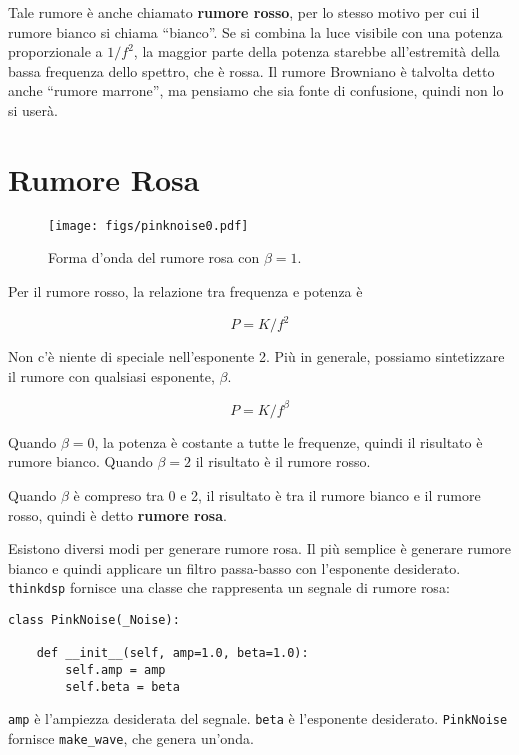 \documentclass[12pt]{book} \usepackage[width=5.5in,height=8.5in, hmarginratio=3:2,vmarginratio=1:1]{geometry}
\begin{document}
Tale rumore è anche chiamato {\bf rumore rosso}, per lo stesso motivo per cui il rumore bianco si chiama ``bianco''. Se si combina la luce visibile con una potenza proporzionale a $1/f^2$, la maggior parte della potenza starebbe all'estremità della bassa frequenza dello spettro, che è rossa. Il rumore Browniano è talvolta detto anche ``rumore marrone'', ma pensiamo che sia fonte di confusione, quindi non lo si userà.

\section{Rumore Rosa} \label{pink} 

\begin{figure} 

\centerline{\texttt{[image: figs/pinknoise0.pdf]}} \caption{Forma d'onda del rumore rosa con $\beta=1$.} \label{fig.pinknoise0} \end{figure} 

Per il rumore rosso, la relazione tra frequenza e potenza è

%
\[ P = K / f^{2} \] 

%
Non c'è niente di speciale nell'esponente 2. Più in generale, possiamo sintetizzare il rumore con qualsiasi esponente, $\beta$.

%
\[ P = K / f^{\beta} \] 

%
Quando $\beta = 0$, la potenza è costante a tutte le frequenze, quindi il risultato è rumore bianco. Quando $\beta=2$ il risultato è il rumore rosso.

Quando $\beta$ è compreso tra 0 e 2, il risultato è tra il rumore bianco e il rumore rosso, quindi è detto {\bf rumore rosa}.

Esistono diversi modi per generare rumore rosa. Il più semplice è generare rumore bianco e quindi applicare un filtro passa-basso con l'esponente desiderato. {\tt thinkdsp} fornisce una classe che rappresenta un segnale di rumore rosa:

\begin{verbatim} 
class PinkNoise(_Noise):

    def __init__(self, amp=1.0, beta=1.0):
        self.amp = amp
        self.beta = beta
 \end{verbatim} 

{\tt amp} è l'ampiezza desiderata del segnale. {\tt beta} è l'esponente desiderato. {\tt PinkNoise} fornisce \verb"make_wave", che genera un'onda.
\end{document}
